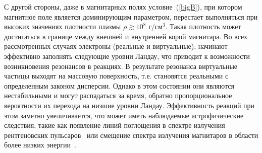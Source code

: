 С другой стороны, даже в магнитарных полях условие~(\ref{bigB}), при котором 
магнитное поле является доминирующим параметром, перестает выполняться при 
высоких значениях плотности плазмы $\rho \gtrsim 10^8$ г/см$^3$. Такая 
плотность может достигаться в  границе между внешней и внутренней корой 
магнитара. Во всех рассмотренных случаях электроны (реальные и виртуальные), начинают 
эффективно заполнять следующие уровни Ландау, что приводит к возможности 
возникновения резонансов в реакциях.
 В результате резонанса виртуальные частицы выходят на массовую поверхность, т.е. становятся реальными с определенным законом дисперсии. 
Однако в этом состоянии они являются нестабильными и могут распадаться за время, обратно пропорциональное вероятности их перехода на низшие уровни Ландау. Эффективность реакций при этом заметно увеличивается, что 
может иметь наблюдаемые астрофизические следствия, такие как появление линий 
поглощения в спектре излучения рентгеновских пульсаров~\cite{Truemper1978} или 
смещение спектра излучения магнитаров в области более низких 
энергии~\cite{Lyutikov:2002}.


